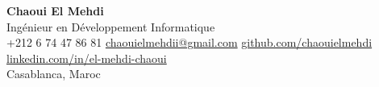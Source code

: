 \documentclass[10pt,a4paper]{article}
\newcommand{\cvname}[1]{{\Huge\bfseries #1}}
\newcommand{\cvtitle}[1]{{\Large\color{cvgray} #1}}
\begin{document}
\begin{center}
    \cvname{Chaoui El Mehdi}\\[2pt]
    \cvtitle{Ingénieur en Développement Informatique}\\[6pt]
    +212 6 74 47 86 81 \;\textbar\;
    \href{mailto:chaouielmehdii@gmail.com}{chaouielmehdii@gmail.com} \;\textbar\;
    \href{https://github.com/chaouielmehdi}{github.com/chaouielmehdi} \;\textbar\;
    \href{https://linkedin.com/in/el-mehdi-chaoui}{linkedin.com/in/el-mehdi-chaoui}\\[2pt]
    Casablanca, Maroc
\end{center}

\vspace{-4pt}






\end{document}
